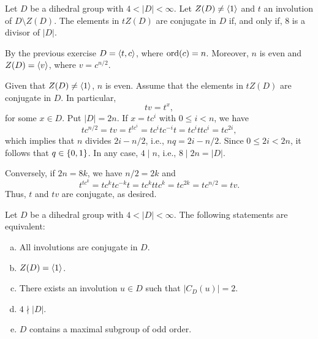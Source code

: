 \begin{exr} Let\/ $D$ be a dihedral group with\/ $4<|D|<\infty$. 
    Let\/ $Z(D)\ne\langle1\rangle$ and\/ $t$ an involution of\/ $D \setminus Z(D)$. The elements in\/ $tZ(D)$ are conjugate in\/ $D$ if, and only if, $8$ is a divisor of\/ $|D|$.
\end{exr}

\begin{solution} By the previous exercise $D=\langle t,c\rangle$, where ${\rm ord}(c)=n$. Moreover, $n$ is even and $Z(D)=\langle v\rangle$, where $v=c^{n/2}$.

Given that $Z(D)\ne\langle1\rangle$, $n$ is even. Assume that the elements in $tZ(D)$ are conjugate in $D$. In particular,
$$
    tv=t^x,
$$
for some $x\in D$. Put $|D|=2n$. If $x=tc^i$ with $0\le i<n$, we have
$$
    tc^{n/2} = tv = t^{tc^i} = tc^itc^{-i}t = tc^ittc^i = tc^{2i},
$$
which implies that $n$ divides $2i-n/2$, i.e., $nq=2i-n/2$. Since $0\le2i<2n$, it follows that $q\in\{0,1\}$. In any case, $4\mid n$, i.e., $8\mid2n=|D|$.

Conversely, if $2n=8k$, we have $n/2=2k$ and
$$
    t^{tc^k} = tc^ktc^{-k}t = tc^kttc^k = tc^{2k} = tc^{n/2}=tv.
$$
Thus, $t$ and $tv$ are conjugate, as desired.  \end{solution}

\begin{exr} Let\/ $D$ be a dihedral group with\/ $4<|D|<\infty$. 
    The following statements are equivalent:
    \begin{enumerate}[a),font=\upshape]
    \item All involutions are conjugate in\/ $D$.
    \item $Z(D) = \langle1\rangle$.
    \item There exists an involution\/ $u \in D$ such that\/ $|C_D(u)| = 2$.
    \item $4 \nmid |D|$.
    \item $D$ contains a maximal subgroup of odd order.
    \end{enumerate}
\end{exr}

